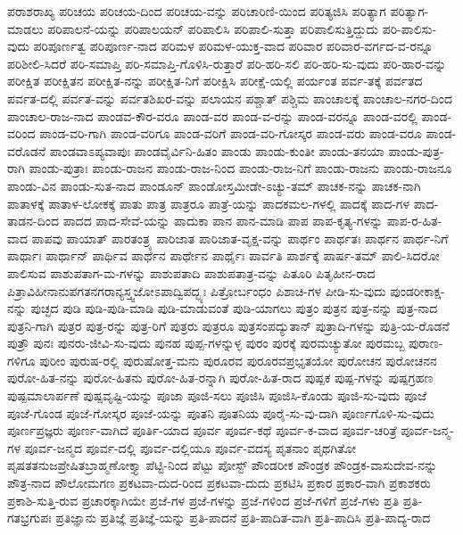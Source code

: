 ಪರಾಶರಾಖ್ಯ
ಪರಿಚಯ
ಪರಿಚಯ-ದಿಂದ
ಪರಿಚಯ-ವನ್ನು
ಪರಿಚಾರಿಣಿ-ಯಿಂದ
ಪರಿತ್ಯಜಿಸಿ
ಪರಿತ್ಯಾಗ
ಪರಿತ್ಯಾಗ-ಮಾಡಲು
ಪರಿಪಾಲನೆ-ಯನ್ನು
ಪರಿಪಾಲಯನ್
ಪರಿಪಾಲಿಸಿ
ಪರಿಪಾಲಿ-ಸುತ್ತಾ
ಪರಿಪಾಲಿಸುತ್ತಿದ್ದುದು
ಪರಿ-ಪಾಲಿಸು-ವುದು
ಪರಿಪೂರ್ಣತ್ವ
ಪರಿಪೂರ್ಣ-ನಾದ
ಪರಿಮಳ
ಪರಿಮಳ-ಯುಕ್ತ-ವಾದ
ಪರಿವಾರ
ಪರಿವಾರ-ವರ್ಗದ-ವ-ರನ್ನೂ
ಪರಿಶೀಲಿ-ಸಿದರೆ
ಪರಿ-ಸಮಾಪ್ತಿ
ಪರಿ-ಸಮಾಪ್ತಿ-ಗೊಳಿಸಿ-ರುತ್ತಾರೆ
ಪರಿ-ಹರಿ-ಸಲಿ
ಪರಿ-ಹರಿ-ಸು-ವುದು
ಪರಿ-ಹಾರ-ವನ್ನು
ಪರೀಕ್ಷಿತ
ಪರೀಕ್ಷಿತನ
ಪರೀಕ್ಷಿತ-ನನ್ನು
ಪರೀಕ್ಷಿತ-ನಿಗೆ
ಪರೀಕ್ಷಿಸಿ
ಪರೀಕ್ಷೆ-ಯಲ್ಲಿ
ಪರ್ಯಂತ
ಪರ್ವ-ತಕ್ಕೆ
ಪರ್ವತದ
ಪರ್ವತ-ದಲ್ಲಿ
ಪರ್ವತ-ವನ್ನು
ಪರ್ವತಶಿಖರ-ವನ್ನು
ಪಲಾಯನ
ಪಶ್ಚಾತ್
ಪಶ್ಚಿಮ
ಪಾಂಚಾಲಕ್ಕೆ
ಪಾಂಚಾಲ-ನಗರ-ದಿಂದ
ಪಾಂಚಾಲ-ರಾಜ-ನಾದ
ಪಾಂಡವ-ಕೌರ-ವರೂ
ಪಾಂಡ-ವರ
ಪಾಂಡ-ವ-ರನ್ನು
ಪಾಂಡ-ವರನ್ನೂ
ಪಾಂಡ-ವರಲ್ಲಿ
ಪಾಂಡ-ವರಿಂದ
ಪಾಂಡ-ವರಿ-ಗಾಗಿ
ಪಾಂಡ-ವರಿಗೂ
ಪಾಂಡ-ವರಿಗೆ
ಪಾಂಡ-ವರಿ-ಗೋಸ್ಕರ
ಪಾಂಡ-ವರು
ಪಾಂಡ-ವರೂ
ಪಾಂಡ-ವರೊಡನೆ
ಪಾಂಡವಾಽಪ್ಯವಾಪುಃ
ಪಾಂಡವೈರ್ವಿನಿ-ಹಿತಂ
ಪಾಂಡು
ಪಾಂಡು-ಕುಂತೀ
ಪಾಂಡು-ತನಯಾ
ಪಾಂಡು-ಪುತ್ರ-ರಾಗಿ
ಪಾಂಡು-ಪುತ್ರಾಃ
ಪಾಂಡು-ರಾಜನ
ಪಾಂಡು-ರಾಜ-ನಿಂದ
ಪಾಂಡು-ರಾಜ-ನಿಗೆ
ಪಾಂಡು-ರಾಜನು
ಪಾಂಡು-ರಾಜನೂ
ಪಾಂಡು-ವಿನ
ಪಾಂಡು-ಸುತ-ನಾದ
ಪಾಂಡೂನ್
ಪಾಂಡೋಸ್ತಮೀಡೇ-ಽಚ್ಯು-ತಮ್
ಪಾಚಕ-ನನ್ನು
ಪಾಚಕ-ನಾಗಿ
ಪಾತಾಳಕ್ಕೆ
ಪಾತಾಳ-ಲೋಕಕ್ಕೆ
ಪಾತು
ಪಾತ್ರ
ಪಾತ್ರರೂ
ಪಾತ್ರೆ-ಯನ್ನು
ಪಾದಕಮಲ-ಗಳಲ್ಲಿ
ಪಾದಕ್ಕೆ
ಪಾದ-ಗಳ
ಪಾದ-ತಾಡನ-ದಿಂದ
ಪಾದದ
ಪಾದ-ಸೇವೆ-ಯನ್ನು
ಪಾದುಕಾ
ಪಾನ
ಪಾನ-ಮಾಡಿ
ಪಾಪ
ಪಾಪ-ಕೃತ್ಯ-ಗಳನ್ನು
ಪಾಪ-ರ-ಹಿತ-ವಾದ
ಪಾಪವು
ಪಾಯಾತ್
ಪಾರತಂತ್ರ್ಯ
ಪಾರಿಜಾತ
ಪಾರಿಜಾತ-ವೃಕ್ಷ-ವನ್ನು
ಪಾರ್ಥಂ
ಪಾರ್ಥತಃ
ಪಾರ್ಥನ
ಪಾರ್ಥ-ನಿಗೆ
ಪಾರ್ಥಾಃ
ಪಾರ್ಥಾನ್
ಪಾರ್ಥಿವ
ಪಾರ್ಥೆನ
ಪಾರ್ಥೇನ
ಪಾರ್ಥೈಃ
ಪಾರ್ವತಿ
ಪಾರ್ಶಕ್ಕೆ
ಪಾರ್ಷ-ತಮ್
ಪಾಲಿ-ಸಿದರೋ
ಪಾಲಿಸುವ
ಪಾಶುಪತಾಗ-ಮ-ಗಳನ್ನು
ಪಾಶುಪತಾದಿ
ಪಾಶುಪತಾತ್ರ-ವನ್ನು
ಪಿತೂರಿ
ಪಿತೃಹೀನ-ರಾದ
ಪಿತ್ರಾವಿಹೀನಾನುಪಗತನಗರಾನ್ಯಸ್ತ್ವಜೋಽಪಾದ್ವಿಪದ್ಭ್ಯಃ
ಪಿತ್ರೋರ್ಬಂಧಂ
ಪಿಶಾಚಿ-ಗಳ
ಪೀಡಿ-ಸು-ವುದು
ಪುಂಡರೀಕಾಕ್ಷ-ನನ್ನು
ಪುಚ್ಛದ
ಪುಡಿ
ಪುಡಿ-ಪುಡಿ-ಮಾಡಿ
ಪುಡಿ-ಮಾಡುವಂತೆ
ಪುಡಿ-ಯಾಗಲು
ಪುತ್ರಂ
ಪುತ್ರನ
ಪುತ್ರ-ನನ್ನು
ಪುತ್ರ-ನಾದ
ಪುತ್ರನಿ-ಗಾಗಿ
ಪುತ್ರರ
ಪುತ್ರ-ರನ್ನು
ಪುತ್ರ-ರಿಗೆ
ಪುತ್ರರು
ಪುತ್ರರೂ
ಪುತ್ರಸಂಪದ್ಯುತಾನ್
ಪುತ್ರಾದಿ-ಗಳನ್ನು
ಪುತ್ರಿ-ಯ-ರೊಡನೆ
ಪುತ್ರೌ
ಪುನಃ
ಪುನರು-ಜೀವಿ-ಸು-ವುದು
ಪುನಹ
ಪುಪ್ಪ-ಗಳನ್ನುಳ್ಳ
ಪುರಂ
ಪುರಕ್ಕೆ
ಪುರಮಚ್ಯುತೋ
ಪುರಮಬ್ಬ
ಪುರಾಣ-ಗಳಿಗೂ
ಪುರೀಂ
ಪುರುಷ-ರಲ್ಲಿ
ಪುರುಷೋತ್ತ-ಮನು
ಪುರೂರವ
ಪುರೂರವಪ್ರಭೃತಯೋ
ಪುರೋಚನ
ಪುರೋಚನನ
ಪುರೋ-ಹಿತ-ನನ್ನು
ಪುರೋ-ಹಿತನು
ಪುರೋ-ಹಿತ-ರನ್ನಾಗಿ
ಪುರೋ-ಹಿತ-ರಾದ
ಪುಷ್ಪಕ
ಪುಷ್ಪ-ಗಳನ್ನು
ಪುಷ್ಪಗ್ರಹಣ
ಪುಷ್ಪಮಾಲಾರ್ಪಣೆ
ಪುಷ್ಪವೃಷ್ಟಿ-ಯನ್ನು
ಪೂಜಾ
ಪೂಜಿ-ಸಲು
ಪೂಜಿಸಿ
ಪೂಜಿಸಿ-ಕೊಂಡು
ಪೂಜಿ-ಸು-ವುದು
ಪೂಜೆ
ಪೂಜೆ-ಗೊಂಡ
ಪೂಜೆ-ಗೋಸ್ಕರ
ಪೂಜೆ-ಯನ್ನು
ಪೂತನಿ
ಪೂತನಿಯ
ಪೂರೈ-ಸು-ವು-ದಾಗಿ
ಪೂರ್ಣಗೊಳಿ-ಸು-ವುದು
ಪೂರ್ಣಪ್ರಜ್ಞರು
ಪೂರ್ಣ-ವಾಗಿದೆ
ಪೂರ್ತಿ-ಯಾದ
ಪೂರ್ವ
ಪೂರ್ವ-ಕಥೆ
ಪೂರ್ವ-ಕ-ವಾದ
ಪೂರ್ವ-ಚರಿತ್ರೆ
ಪೂರ್ವ-ಜನ್ಮ-ಗಳ
ಪೂರ್ವ-ಜನ್ಮದ
ಪೂರ್ವ-ದಲ್ಲಿ
ಪೂರ್ವ-ದಲ್ಲಿಯೂ
ಪೂರ್ವ-ವದಸ್ಯ
ಪೃತನಾಂ
ಪೃಥಗಿತೋ
ಪೃಷತತನುಜಪ್ರೇಷಿತಬ್ರಾಹ್ಮಣೋಕ್ತ್ಯಾ
ಪೆಟ್ಟಿ-ನಿಂದ
ಪೆಟ್ಟು
ಪೋಸ್ಟ್
ಪೌಂಡರೀಕ
ಪೌಂಡ್ರಕ
ಪೌಂಡ್ರಕ-ವಾಸುದೇವ-ನನ್ನು
ಪೌತ್ರ-ನಾದ
ಪೌಲೋಮಗಣ
ಪ್ರಕಟವಾ-ದುದ-ರಿಂದ
ಪ್ರಕಟವಾ-ದುದು
ಪ್ರಕಟಿಸಿ
ಪ್ರಕಾರ
ಪ್ರಕಾರ-ವಾಗಿ
ಪ್ರಕಾಶಕರು
ಪ್ರಕಾಶಿ-ಸುತ್ತಿ-ರುವ
ಪ್ರಚಾರಕ್ಕಾಗಿಯೇ
ಪ್ರಜೆ-ಗಳ
ಪ್ರಜೆ-ಗಳನ್ನು
ಪ್ರಜೆ-ಗಳಿಂದ
ಪ್ರಜೆ-ಗಳಿಗೆ
ಪ್ರಜೆ-ಗಳು
ಪ್ರತಿ
ಪ್ರತಿ-ಗತಭ್ರಗುಪಃ
ಪ್ರತಿಜ್ಞಾನು
ಪ್ರತಿಜ್ಞೆ
ಪ್ರತಿಜ್ಞೆ-ಯನ್ನು
ಪ್ರತಿ-ಪಾದನೆ
ಪ್ರತಿ-ಪಾದಿತ-ವಾಗಿ
ಪ್ರತಿ-ಪಾದಿಸಿ
ಪ್ರತಿ-ಪಾದ್ಯ-ರಾದ
